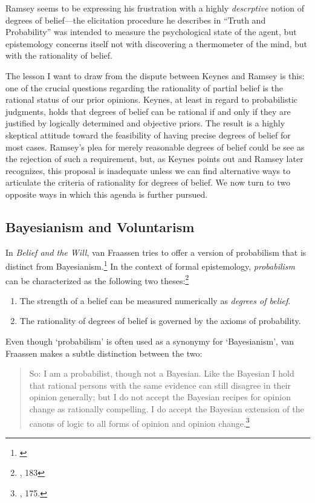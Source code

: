 Ramsey seems to be expressing his frustration with a highly \emph{descrptive} notion of degrees of belief---the elicitation procedure he describes in ``Truth and Probability'' was intended to measure the psychological state of the agent, but epistemology concerns itself not with discovering a thermometer of the mind, but with the rationality of belief. 

The lesson I want to draw from the dispute between Keynes and Ramsey is
this: one of the crucial questions regarding the rationality of partial
belief is the rational status of our prior opinions. Keynes, at least in
regard to probabilistic judgments, holds that degrees of belief can be
rational if and only if they are justified by logically
determined and objective priors. The result is a highly skeptical
attitude toward the feasibility of having precise degrees of belief for
most cases. Ramsey's plea for merely reasonable degrees of belief could
be see as the rejection of such a requirement, but, as Keynes points out and Ramsey later recognizes,
this proposal is inadequate unless we can find alternative ways to
articulate the criteria of rationality for degrees of belief. We now turn to two opposite ways in which this agenda is further pursued.



\hypertarget{bayesianism-and-voluntarism}{%
\subsection{Bayesianism and
Voluntarism}\label{sec:bayesianism-and-voluntarism}}

In \emph{Belief and the Will}, van Fraassen tries to offer a version of
probabilism that is distinct from Bayesianism.\footnote{\cite{beliefwill}} In the context of formal
epistemology, \emph{probabilism} can be characterized as the following
two theses:\footnote{\cite{erikssonhajek}, 183}

\begin{enumerate}
\tightlist
\item
  The strength of a belief can be measured numerically as \emph{degrees
  of belief}.
\item
  The rationality of degrees of belief is governed by the axioms of
  probability.
\end{enumerate}

Even though `probabilism' is often used as a synonymy for `Bayesianism',
van Fraassen makes a subtle distinction between the two:

\begin{quote}
So: I am a probabilist, though not a Bayesian. Like the Bayesian I hold
that rational persons with the same evidence can still disagree in their
opinion generally; but I do not accept the Bayesian recipes for opinion
change as rationally compelling. I do accept the Bayesian extension of
the canons of logic to all forms of opinion and opinion
change.\footnote{\cite{bvflaws}, 175.}
\end{quote}

